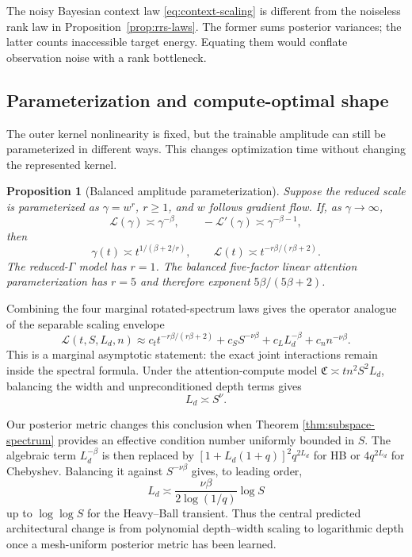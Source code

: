 \documentclass[11pt,a4paper]{article}
\numberwithin{equation}{section}
\newtheorem{proposition}[theorem]{Proposition}
\theoremstyle{definition}
\theoremstyle{remark}
\newcommand{\loss}{\mathcal L}
\begin{document}
The noisy Bayesian context law \eqref{eq:context-scaling} is different from
the noiseless rank law in Proposition~\ref{prop:rrs-laws}.  The former sums
posterior variances; the latter counts inaccessible target energy.  Equating
them would conflate observation noise with a rank bottleneck.

\subsection{Parameterization and compute-optimal shape}

The outer kernel nonlinearity is fixed, but the trainable amplitude can still
be parameterized in different ways.  This changes optimization time without
changing the represented kernel.

\begin{proposition}[Balanced amplitude parameterization]
\label{prop:amplitude-parameterization}
Suppose the reduced scale is parameterized as $\gamma=w^r$, $r\ge1$, and
$w$ follows gradient flow.  If, as \(\gamma\to\infty\),
\[
 \loss(\gamma)\asymp\gamma^{-\beta},
 \qquad
 -\loss'(\gamma)\asymp\gamma^{-\beta-1},
\]
then
\begin{equation}
 \gamma(t)\asymp t^{1/(\beta+2/r)},
 \qquad
 \loss(t)\asymp
 t^{-r\beta/(r\beta+2)}.
 \label{eq:parameterized-time-law}
\end{equation}
The reduced-$\Gamma$ model has $r=1$.  The balanced five-factor linear
attention parameterization has $r=5$ and therefore exponent
$5\beta/(5\beta+2)$.
\end{proposition}

Combining the four marginal rotated-spectrum laws gives the operator analogue
of the separable scaling envelope
\begin{equation}
 \loss(t,S,L_d,n)
 \approx
 c_t t^{-r\beta/(r\beta+2)}
 +c_SS^{-\nu\beta}
 +c_LL_d^{-\beta}
 +c_nn^{-\nu\beta}.
 \label{eq:bordelon-envelope}
\end{equation}
This is a marginal asymptotic statement: the exact joint interactions remain
inside the spectral formula.  Under the attention-compute model
$\mathfrak C\asymp t n^2S^2L_d$, balancing the width and unpreconditioned depth
terms gives
\begin{equation}
 L_d\asymp S^\nu.
 \label{eq:original-shape}
\end{equation}

Our posterior metric changes this conclusion when Theorem
\ref{thm:subspace-spectrum} provides an effective condition number uniformly
bounded in \(S\).
The algebraic term $L_d^{-\beta}$ is then replaced by
$[1+L_d(1+q)]^2q^{2L_d}$ for HB or $4q^{2L_d}$ for Chebyshev.  Balancing it
against $S^{-\nu\beta}$ gives, to leading order,
\begin{equation}
 L_d\asymp\frac{\nu\beta}{2\log(1/q)}\log S
 \label{eq:preconditioned-shape}
\end{equation}
up to $\log\log S$ for the Heavy--Ball transient.  Thus the central predicted
architectural change is from polynomial depth--width scaling to logarithmic
depth once a mesh-uniform posterior metric has been learned.
\end{document}
